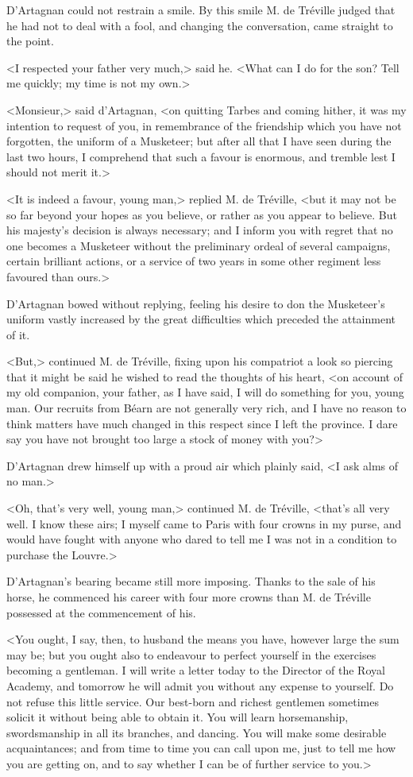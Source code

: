 D'Artagnan could not restrain a smile. By this smile M. de Tréville judged that he had not to deal with a fool, and changing the conversation, came straight to the point. 

<I respected your father very much,> said he. <What can I do for the son? Tell me quickly; my time is not my own.> 

<Monsieur,> said d'Artagnan, <on quitting Tarbes and coming hither, it was my intention to request of you, in remembrance of the friendship which you have not forgotten, the uniform of a Musketeer; but after all that I have seen during the last two hours, I comprehend that such a favour is enormous, and tremble lest I should not merit it.> 

<It is indeed a favour, young man,> replied M. de Tréville, <but it may not be so far beyond your hopes as you believe, or rather as you appear to believe. But his majesty's decision is always necessary; and I inform you with regret that no one becomes a Musketeer without the preliminary ordeal of several campaigns, certain brilliant actions, or a service of two years in some other regiment less favoured than ours.> 

D'Artagnan bowed without replying, feeling his desire to don the Musketeer's uniform vastly increased by the great difficulties which preceded the attainment of it. 

<But,> continued M. de Tréville, fixing upon his compatriot a look so piercing that it might be said he wished to read the thoughts of his heart, <on account of my old companion, your father, as I have said, I will do something for you, young man. Our recruits from Béarn are not generally very rich, and I have no reason to think matters have much changed in this respect since I left the province. I dare say you have not brought too large a stock of money with you?> 

D'Artagnan drew himself up with a proud air which plainly said, <I ask alms of no man.> 

<Oh, that's very well, young man,> continued M. de Tréville, <that's all very well. I know these airs; I myself came to Paris with four crowns in my purse, and would have fought with anyone who dared to tell me I was not in a condition to purchase the Louvre.> 

D'Artagnan's bearing became still more imposing. Thanks to the sale of his horse, he commenced his career with four more crowns than M. de Tréville possessed at the commencement of his. 

<You ought, I say, then, to husband the means you have, however large the sum may be; but you ought also to endeavour to perfect yourself in the exercises becoming a gentleman. I will write a letter today to the Director of the Royal Academy, and tomorrow he will admit you without any expense to yourself. Do not refuse this little service. Our best-born and richest gentlemen sometimes solicit it without being able to obtain it. You will learn horsemanship, swordsmanship in all its branches, and dancing. You will make some desirable acquaintances; and from time to time you can call upon me, just to tell me how you are getting on, and to say whether I can be of further service to you.> 

